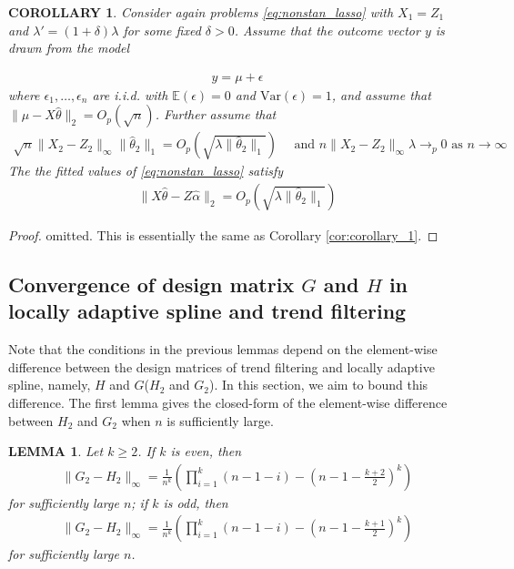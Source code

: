 \documentclass[a4paper]{article}
\newtheorem{lemma}{LEMMA}
\newtheorem{corollary}{COROLLARY}
\newcommand{\E}{\mathbb{E}}
\begin{document}
\begin{corollary}
Consider again problems \eqref{eq:nonstan_lasso} with $X_1 = Z_1$ and $\lambda' = (1+\delta)\lambda$ for some fixed $\delta > 0$. Assume that the outcome vector $y$ is drawn from the model

\begin{align*}
y = \mu + \epsilon
\end{align*}
where $\epsilon_1,\ldots, \epsilon_n$ are i.i.d. with $\E(\epsilon) = 0$ and $\mbox{Var}(\epsilon) = 1$, and assume that $\|\mu-X\hat{\theta}\|_2 = O_p(\sqrt{n})$. Further assume that
\begin{align*}
\sqrt{n}\|X_2-Z_2\|_\infty\|\hat{\theta}_2\|_1 = O_p(\sqrt{\lambda\|\hat{\theta}_2\|_1}) \quad \text{ and } n\|X_2-Z_2\|_\infty\lambda \rightarrow_p 0 \text{ as } n\rightarrow \infty
\end{align*}
The the fitted values of \eqref{eq:nonstan_lasso} satisfy 
\begin{align*}
\|X\hat{\theta} - Z\hat{\alpha}\|_2 = O_p(\sqrt{\lambda\|\hat{\theta}_2\|_1})
\end{align*}
\label{cor:corollary_2}
\end{corollary}

\begin{proof}
omitted. This is essentially the same as Corollary \ref{cor:corollary_1}.
\end{proof}

\subsection{Convergence of design matrix $G$ and $H$ in locally adaptive spline and trend filtering}

Note that the conditions in the previous lemmas depend on the element-wise difference between the design matrices of trend filtering and locally adaptive spline, namely, $H$ and $G$($H_2$ and $G_2$). In this section, we aim to bound this difference. The first lemma gives the closed-form of the element-wise difference between $H_2$ and $G_2$ when $n$ is sufficiently large.

\begin{lemma}
Let $k\geq 2$. If $k$ is even, then
\begin{align*}
\|G_2-H_2\|_\infty = \frac{1}{n^k}(\prod_{i=1}^k (n-1-i) - (n - 1- \frac{k+2}{2})^k)
\end{align*}
for sufficiently large $n$; if $k$ is odd, then
\begin{align*}
\|G_2- H_2\|_\infty = \frac{1}{n^k}(\prod_{i=1}^k (n-1-i) - (n-1-\frac{k+1}{2})^k)
\end{align*}for sufficiently large $n$.
\label{lemma:lemma_diff}
\end{lemma}
\end{document}
